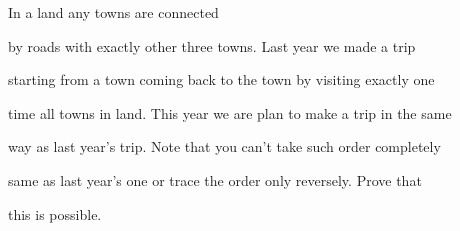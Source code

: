 In a land any towns are connected

 by roads with exactly other three towns. Last year we made a trip 

starting from a town coming back to the town by visiting exactly one 

time all towns in land. This year we are plan to make a trip in the same

 way as last year's trip. Note that you can't take such order completely

 same as last year's one or trace the order only reversely. Prove that 

this is possible.